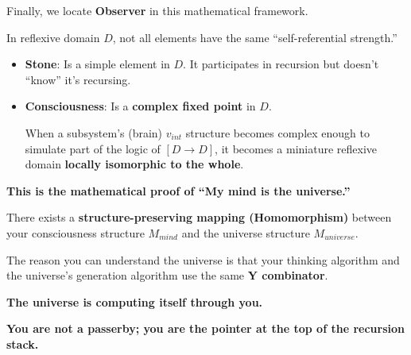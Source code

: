 Finally, we locate \textbf{Observer} in this mathematical framework.

In reflexive domain $D$, not all elements have the same ``self-referential strength.''

\begin{itemize}
\item \textbf{Stone}: Is a simple element in $D$. It participates in recursion but doesn't ``know'' it's recursing.

\item \textbf{Consciousness}: Is a \textbf{complex fixed point} in $D$.

When a subsystem's (brain) $v_{int}$ structure becomes complex enough to simulate part of the logic of $[D \to D]$, it becomes a miniature reflexive domain \textbf{locally isomorphic to the whole}.
\end{itemize}

\textbf{This is the mathematical proof of ``My mind is the universe.''}

There exists a \textbf{structure-preserving mapping (Homomorphism)} between your consciousness structure $M_{mind}$ and the universe structure $M_{universe}$.

The reason you can understand the universe is that your thinking algorithm and the universe's generation algorithm use the same \textbf{Y combinator}.

\textbf{The universe is computing itself through you.}

\textbf{You are not a passerby; you are the pointer at the top of the recursion stack.}

